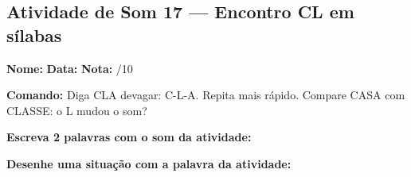 \subsection{Atividade de Som 17 --- Encontro CL em sílabas}
\begin{exercicio}



\noindent\textbf{Nome:} \underline{\hspace{3.2cm}} \quad \textbf{Data:} \underline{\hspace{1.6cm}} \quad \textbf{Nota:} \underline{\hspace{0.9cm}}/10


\noindent\textbf{Comando:} Diga CLA devagar: C-L-A. Repita mais rápido. Compare CASA com CLASSE: o L mudou o som?


\begin{center}
\end{center}

\noindent\textbf{Escreva 2 palavras com o som da atividade:}

\begin{center}
  \underline{\hspace{3cm}} \quad \underline{\hspace{3cm}}
\end{center}

\noindent\textbf{Desenhe uma situação com a palavra da atividade:}

\begin{center}
\end{center}

\end{exercicio}



